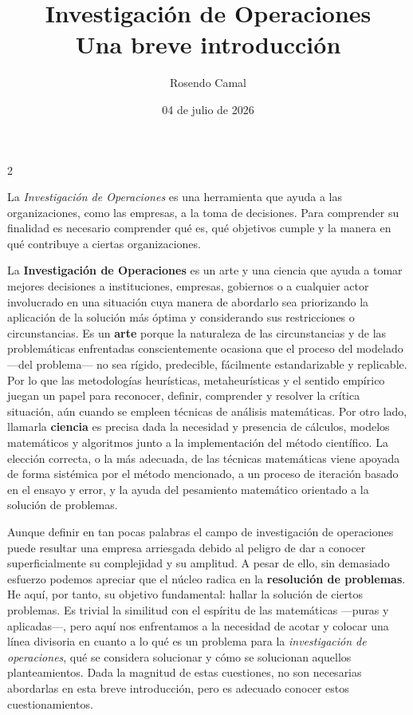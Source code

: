 \documentclass[12pt]{article}
\title{Investigación de Operaciones \\
	\vspace{0.4cm}
	\Large Una breve introducción
}
\date{04 de julio de 2026}
\author{Rosendo Camal}
\begin{document}
\maketitle

\begin{multicols}{2}

La \textit{Investigación de Operaciones} es una herramienta que ayuda a las organizaciones, como las empresas, a la toma de decisiones. Para comprender su finalidad es necesario comprender qué es, qué objetivos cumple y la manera en qué contribuye a ciertas organizaciones.
\newline


La \textbf{Investigación de Operaciones} es un arte y una ciencia que ayuda a tomar mejores decisiones a instituciones, empresas, gobiernos o a cualquier actor involucrado en una situación cuya manera de abordarlo sea priorizando la aplicación de la solución más óptima y considerando sus restricciones o circunstancias. Es un \textbf{arte} porque la naturaleza de las circunstancias y de las problemáticas enfrentadas conscientemente ocasiona que el proceso del modelado ---del problema--- no sea rígido, predecible, fácilmente estandarizable y replicable. Por lo que las metodologías heurísticas, metaheurísticas y el sentido empírico juegan un papel para reconocer, definir, comprender y resolver la crítica situación, aún cuando se empleen técnicas de análisis matemáticas. Por otro lado, llamarla \textbf{ciencia} es precisa dada la necesidad y presencia de cálculos, modelos matemáticos y algoritmos junto a la implementación del método científico. La elección correcta, o la más adecuada, de las técnicas matemáticas viene apoyada de forma sistémica por el método mencionado, a un proceso de iteración basado en el ensayo y error, y la ayuda del pesamiento matemático orientado a la solución de problemas.
\newline

Aunque definir en tan pocas palabras el campo de investigación de operaciones puede resultar una empresa arriesgada debido al peligro de dar a conocer superficialmente su complejidad y su amplitud. A pesar de ello, sin demasiado esfuerzo podemos apreciar que  el núcleo radica en la \textbf{resolución de problemas}. He aquí, por tanto, su objetivo fundamental: hallar la solución de ciertos problemas. Es trivial la similitud con el espíritu de las matemáticas ---puras y aplicadas---, pero aquí nos enfrentamos a la necesidad de acotar y colocar una línea divisoria en cuanto a lo qué es un problema para la \textit{investigación de operaciones}, qué se considera solucionar y cómo se solucionan aquellos planteamientos. Dada la magnitud de estas cuestiones, no son necesarias abordarlas en esta breve introducción, pero es adecuado conocer estos cuestionamientos.
\newline


\end{multicols}
\end{document}
